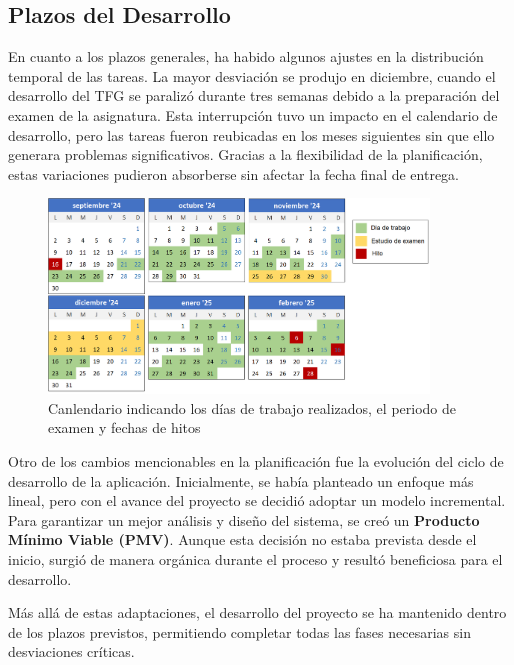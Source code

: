 \newpage

\subsection{Plazos del Desarrollo}

En cuanto a los plazos generales, ha habido algunos ajustes en la distribución temporal de las tareas. La mayor desviación se produjo en diciembre, cuando el desarrollo del TFG se paralizó durante tres semanas debido a la preparación del examen de la asignatura. Esta interrupción tuvo un impacto en el calendario de desarrollo, pero las tareas fueron reubicadas en los meses siguientes sin que ello generara problemas significativos. Gracias a la flexibilidad de la planificación, estas variaciones pudieron absorberse sin afectar la fecha final de entrega.

\begin{figure}[H]
    \centering
    \includegraphics[width=0.9\textwidth]{figures/syc/calendario_trabajo.png}
    \vspace{0.5cm}
    \caption{Canlendario indicando los días de trabajo realizados, el periodo de examen y fechas de hitos}
    \label{tab:calendario_trabajo}
\end{figure}


Otro de los cambios mencionables en la planificación fue la evolución del ciclo de desarrollo de la aplicación. Inicialmente, se había planteado un enfoque más lineal, pero con el avance del proyecto se decidió adoptar un modelo incremental. Para garantizar un mejor análisis y diseño del sistema, se creó un \textbf{Producto Mínimo Viable (PMV)}. Aunque esta decisión no estaba prevista desde el inicio, surgió de manera orgánica durante el proceso y resultó beneficiosa para el desarrollo.

Más allá de estas adaptaciones, el desarrollo del proyecto se ha mantenido dentro de los plazos previstos, permitiendo completar todas las fases necesarias sin desviaciones críticas.

